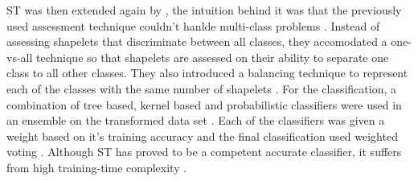 ST was then extended again by \cite{Bostrom2017}, the intuition behind it was that the previously used assessment technique couldn't hanlde multi-class problems \cite{Bostrom2017}.
Instead of assessing shapelets that discriminate between all classes, they accomodated a one-vs-all technique so that shapelets are assessed on their ability to separate one class to all other classes.
They also introduced a balancing technique to represent each of the classes with the same number of shapelets \cite{bagnall2017great}.
For the classification, a combination of tree based, kernel based and probabilistic classifiers were used in an ensemble on the transformed data set \cite{shifaz2020ts,lines2018time}.
Each of the classifiers was given a weight based on it's training accuracy and the final classification used weighted voting \cite{Bostrom2017}.
Although ST has proved to be a competent accurate classifier, it suffers from high training-time complexity \cite{shifaz2020ts}.